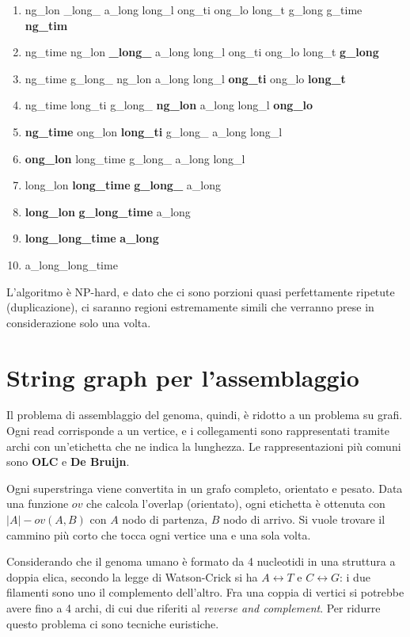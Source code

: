 \begin{enumerate}
	\item ng\_lon \_long\_ a\_long long\_l ong\_ti ong\_lo long\_t g\_long g\_time \textbf{ng\_tim}
	\item ng\_time ng\_lon \textbf{\_long\_} a\_long long\_l ong\_ti ong\_lo long\_t \textbf{g\_long}
	\item ng\_time g\_long\_ ng\_lon a\_long long\_l \textbf{ong\_ti} ong\_lo \textbf{long\_t}
	\item ng\_time long\_ti g\_long\_ \textbf{ng\_lon} a\_long long\_l \textbf{ong\_lo}
	\item \textbf{ng\_time} ong\_lon \textbf{long\_ti} g\_long\_ a\_long long\_l
	\item \textbf{ong\_lon} long\_time g\_long\_ a\_long long\_l
	\item long\_lon \textbf{long\_time} \textbf{g\_long\_} a\_long
	\item \textbf{long\_lon} \textbf{g\_long\_time} a\_long
	\item \textbf{long\_long\_time} \textbf{a\_long}
	\item a\_long\_long\_time
\end{enumerate}

L'algoritmo è NP-hard, e dato che ci sono porzioni quasi perfettamente ripetute (duplicazione), ci saranno regioni estremamente simili che verranno prese in considerazione solo una volta.

\newpage
\section{String graph per l'assemblaggio}
Il problema di assemblaggio del genoma, quindi, è ridotto a un problema su grafi. Ogni read corrisponde a un vertice, e i collegamenti sono rappresentati tramite archi con un'etichetta che ne indica la lunghezza. Le rappresentazioni più comuni sono \textbf{OLC} e \textbf{De Bruijn}.

Ogni superstringa viene convertita in un grafo completo, orientato e pesato. Data una funzione $ov$ che calcola l'overlap (orientato), ogni etichetta è ottenuta con $|A| - ov(A, B)$ con $A$ nodo di partenza, $B$ nodo di arrivo. Si vuole trovare il cammino più corto che tocca ogni vertice una e una sola volta.

Considerando che il genoma umano è formato da 4 nucleotidi in una struttura a doppia elica, secondo la legge di Watson-Crick si ha $A \leftrightarrow T$ e $C \leftrightarrow G$: i due filamenti sono uno il complemento dell'altro. Fra una coppia di vertici si potrebbe avere fino a 4 archi, di cui due riferiti al \textit{reverse and complement}. Per ridurre questo problema ci sono tecniche euristiche.

